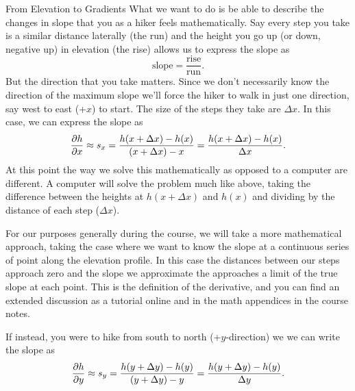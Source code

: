 \begin{activity}{From Elevation to Gradients}
What we want to do is be able to describe the changes in slope that you as a hiker feels mathematically.  Say every step you take is a similar distance laterally (the run) and the height you go up (or down, negative up) in elevation (the rise) allows us to express the slope as
\begin{equation}
    \text{slope} = \frac{\text{rise}}{\text{run}}.
\end{equation}
But the direction that you take matters.  Since we don't necessarily know the direction of the maximum slope we'll force the hiker to walk in just one direction, say west to east (+$x$) to start.  The size of the steps they take are $\Delta x$.  In this case, we can express the slope as
\begin{equation}
    \pdv{h}{x} \approx s_x = 
        \frac{h(x + \Delta x) - h(x)}{(x + \Delta{x}) - x} =
        \frac{h(x + \Delta x) - h(x)}{\Delta x}.
\end{equation}
At this point the way we solve this mathematically as opposed to a computer are different.  A computer will solve the problem much like above, taking the difference between the heights at $h(x + \Delta x)$ and $h(x)$ and dividing by the distance of each step ($\Delta x$).
\begin{framed}
    For our purposes generally during the course, we will take a more mathematical approach, taking the case where we want to know the slope at a continuous series of point along the elevation profile.  In this case the distances between our steps approach zero and the slope we approximate the approaches a limit of the true slope at each point.  This is the definition of the derivative, and you can find an extended discussion as a tutorial online and in the math appendices in the course notes.
\end{framed}

If instead, you were to hike from south to north (+$y$-direction) we we can write the slope as
\begin{equation}
    \pdv{h}{y} \approx s_y = 
        \frac{h(y + \Delta y) - h(y)}{(y + \Delta{y}) - y} =
        \frac{h(y + \Delta y) - h(y)}{\Delta y}.
\end{equation}


\end{activity}
